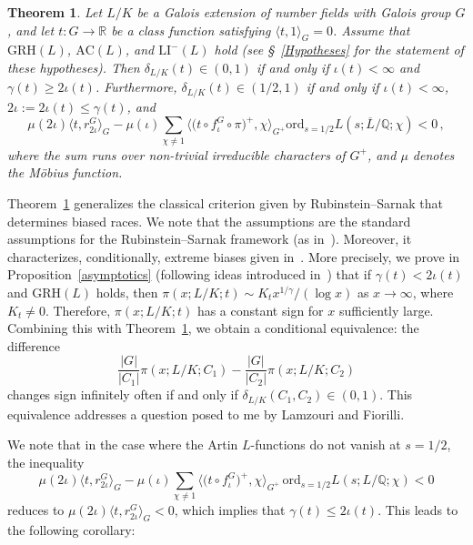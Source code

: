 \documentclass[12pt]{amsart}
\numberwithin{equation}{section}
\newcommand{\Q}{\mathbb Q}
\newcommand{\R}{\mathbb R}
\newtheorem{thm}[X]{Theorem}
\theoremstyle{definition}
\theoremstyle{remark}
\begin{document}
\begin{thm}\label{characterization}
    Let $L/K$ be a Galois extension of number fields with Galois group $G$, and let $t : G \to \R$ be a class function satisfying $\langle t,1\rangle_G=0$. Assume that $\mathrm{GRH}(L)$, $\mathrm{AC}(L)$, and $\mathrm{LI}^-(L)$ hold (see \S~\ref{Hypotheses} for the statement of these hypotheses). Then $\delta_{L/K}(t)\in (0,1)$ if and only if $\iota(t)<\infty$ and $\gamma(t)\ge 2\iota(t)$. Furthermore, $\delta_{L/K}(t)\in (1/2,1)$ if and only if $\iota(t)<\infty$, $2\iota:=2\iota(t)\le \gamma(t)$, and
    \[ \mu(2\iota)\bigl\langle t, r_{2\iota}^G \bigr\rangle_G-\mu(\iota)\sum_{\chi\ne1} \bigl\langle \bigl(t \circ f_\iota^G\circ \pi\bigr)^+, \chi \bigr\rangle_{G^+} \mathrm{ord}_{s=1/2}L(s;\overline{L}/\Q;\chi) <0\, ,\]
    where the sum runs over non-trivial irreducible characters of $G^+$, and $\mu$ denotes the Möbius function.
\end{thm}
Theorem~\ref{characterization} generalizes the classical criterion given by Rubinstein--Sarnak that determines biased races. We note that the assumptions are the standard assumptions for the Rubinstein--Sarnak framework (as in~\cites{Ng, FJ, Bail}). %
Moreover, it characterizes, conditionally, extreme biases given in~\cites{FJ2,Hay}. More precisely, we prove in Proposition~\ref{asymptotics} (following ideas introduced in~\cites{FJ2,Hay}) that if $\gamma(t)<2\iota(t)$ and $\mathrm{GRH}(L)$ holds, then $\pi(x;L/K;t)\sim K_t x^{1/\gamma}/(\log x)$ as $x\to \infty$, where $K_t\ne 0$. Therefore, $\pi(x;L/K;t)$ has a constant sign for $x$ sufficiently large. Combining this with Theorem~\ref{characterization}, we obtain a conditional equivalence: the difference 
\[ \frac{|G|}{|C_1|}\pi(x;L/K;C_1)-\frac{|G|}{|C_2|}\pi(x;L/K;C_2)\] 
changes sign infinitely often if and only if $\delta_{L/K}(C_1,C_2)\in (0,1)$. This equivalence addresses a question posed to me by Lamzouri and Fiorilli.

We note that in the case where the Artin $L$-functions do not vanish at $s=1/2$, the inequality \[ \mu(2\iota)\bigl\langle t, r_{2\iota}^G \bigr\rangle_G-\mu(\iota)\sum_{\chi\ne1} \bigl\langle \bigl(t \circ f_\iota^G\bigr)^+, \chi \bigr\rangle_{G^+}\, \mathrm{ord}_{s=1/2}L(s;L/\Q;\chi) <0\] reduces to $\mu(2\iota)\bigl\langle t,r_{2\iota}^G\bigr\rangle_G<0$, which implies that $\gamma(t)\le 2\iota(t)$. This leads to the following corollary:
\end{document}
